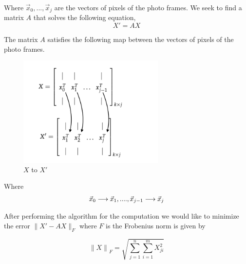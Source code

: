 \documentclass[12pt]{report}
\begin{document}
Where $\vec{x}_{0},...,\vec{x}_{j}$ are the vectors of pixels of the photo
frames. We seek to find a matrix $A$ that solves the following equation,
\begin{equation}
    X' = AX
\end{equation}


The matrix $A$ satisfies the following map between the vectors of pixels
of the photo frames.

\begin{figure} [H]
    \centering
    \includegraphics[width=0.65\textwidth]{X to X'.png}
    \caption{$X$ to $X'$}
\end{figure}

Where %
\begin{equation}
\vec{x}_{0}\longrightarrow \vec{x}_{1},....,\vec{x}_{j-1}\longrightarrow \vec{x}_{j} \\
\end{equation}

After performing the algorithm for the computation we would like to minimize
the error $\parallel X'-AX \parallel_{F}$ where $F$ is the
Frobenius norm is given by

\begin{equation}
    \parallel{X\parallel}_{F} = \sqrt{\sum_{j=1}^{n}\sum_{i=1}^{m}X_{ji}^{2}}
\end{equation}
\end{document}
